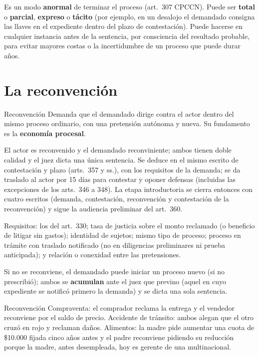 \documentclass[12pt,oneside]{book}
\begin{document}
Es un modo \textbf{anormal} de terminar el proceso (art.~307 CPCCN). Puede ser \textbf{total} o \textbf{parcial}, \textbf{expreso} o \textbf{tácito} (por ejemplo, en un desalojo el demandado consigna las llaves en el expediente dentro del plazo de contestación). Puede hacerse en cualquier instancia antes de la sentencia, por consciencia del resultado probable, para evitar mayores costas o la incertidumbre de un proceso que puede durar años.

\section{La reconvención}

\begin{definition}{Reconvención}
Demanda que el demandado dirige contra el actor dentro del mismo proceso ordinario, con una pretensión autónoma y nueva. Su fundamento es la \textbf{economía procesal}.
\end{definition}

El actor es reconvenido y el demandado reconviniente; ambos tienen doble calidad y el juez dicta una única sentencia. Se deduce en el mismo escrito de contestación y plazo (arts.~357 y ss.), con los requisitos de la demanda; se da traslado al actor por 15 días para contestar y oponer defensas (incluidas las excepciones de los arts.~346 a 348). La etapa introductoria se cierra entonces con cuatro escritos (demanda, contestación, reconvención y contestación de la reconvención) y sigue la audiencia preliminar del art.~360.

Requisitos: los del art.~330; tasa de justicia sobre el monto reclamado (o beneficio de litigar sin gastos); identidad de sujetos; mismo tipo de proceso; proceso en trámite con traslado notificado (no en diligencias preliminares ni prueba anticipada); y relación o conexidad entre las pretensiones.

Si no se reconviene, el demandado puede iniciar un proceso nuevo (si no prescribió); ambos se \textbf{acumulan} ante el juez que previno (aquel en cuyo expediente se notificó primero la demanda) y se dicta una sola sentencia.

\begin{example}{Reconvención}
Compraventa: el comprador reclama la entrega y el vendedor reconviene por el saldo de precio. Accidente de tránsito: ambos alegan que el otro cruzó en rojo y reclaman daños. Alimentos: la madre pide aumentar una cuota de \$10.000 fijada cinco años antes y el padre reconviene pidiendo su reducción porque la madre, antes desempleada, hoy es gerente de una multinacional.
\end{example}
\end{document}
